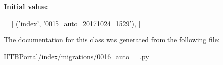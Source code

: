 {\bfseries Initial value\+:}
\begin{DoxyCode}
=  [
        (\textcolor{stringliteral}{'index'}, \textcolor{stringliteral}{'0015\_auto\_20171024\_1529'}),
    ]
\end{DoxyCode}


The documentation for this class was generated from the following file\+:\begin{DoxyCompactItemize}
\item 
I\+I\+T\+B\+Portal/index/migrations/0016\+\_\+auto\+\_\+\_.\+py\end{DoxyCompactItemize}
